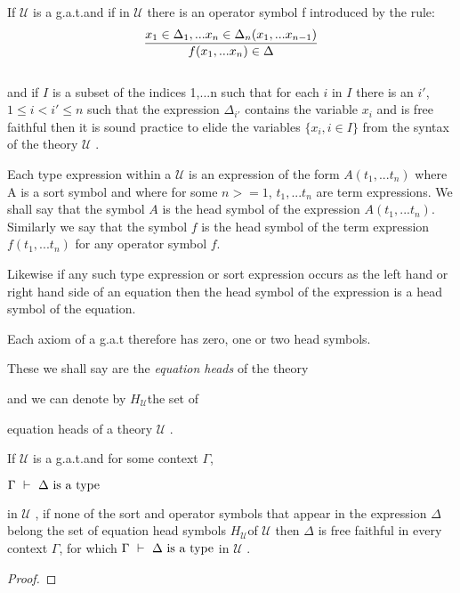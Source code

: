 \documentclass[10pt,a4paper,fleqn]{article}
\newcommand{\gat}[1][U]{
\ensuremath{\mathcal{#1}} }
\newcommand{\isagat}[1][U]{\gat[#1] is a g.a.t.}
\newcommand{\heads}[1][U]{\ensuremath{H_{\gat[#1]}}}
\begin{document}
\begin{lemma}
If \isagat and if in \gat there is an operator symbol f introduced by the rule:\\

$$\frac{x_1 \in \Delta_1,... x_{n} \in \Delta_{n}(x_1,...x_{n-1})}{f(x_1,...x_n) \in \Delta}$$ \\

\noindent
and if $I$ is a subset of the indices {1,...n} such that for each $i$ in $I$ there is an
$i'$, $1 \leq i < i'\leq n$ such that the expression $\Delta_{i'}$ contains the variable 
$x_i$ and  is free faithful then it is sound practice to elide the variables $\{x_i, i \in I \}$ from the
syntax of the theory \gat.
\end{lemma}



\begin{definition}
Each type expression within a \gat is an expression of the form $A(t_1,...t_n)$
where A is a sort symbol and where for some $n >= 1$, $t_1,...t_n$ are term expressions.
We shall say that the symbol $A$ is the head symbol of the expression $A(t_1,...t_n)$.
Similarly we say that the symbol $f$ is the head symbol of the term expression
$f(t_1,...t_n)$ for any operator symbol $f$. 

Likewise if any such type expression or sort expression occurs as the left hand or right hand side of an equation then the head symbol of the expression is a head symbol of the equation. 

Each axiom of a g.a.t therefore has zero, one or two head symbols. 

These we shall say are the \textit{equation heads} of the theory 

and we can denote by \heads the set of 

equation heads of a theory \gat.
\end{definition}

\begin{lemma}
If \isagat and for some context $\Gamma$, \\
\begin{center}
$\Gamma\  \tstyle\ \isT{\Delta}$ 
\end{center}
\noindent
in \gat, if none of the sort and operator symbols that appear in the expression $\Delta$ belong the set of equation head symbols \heads of \gat then $\Delta$ is 
free faithful in every context $\Gamma$, for which  $\Gamma\  \tstyle\ \isT{\Delta}$ in \gat.
\end{lemma}
 
\begin{proof}

\end{proof}
 



 
\end{document}
